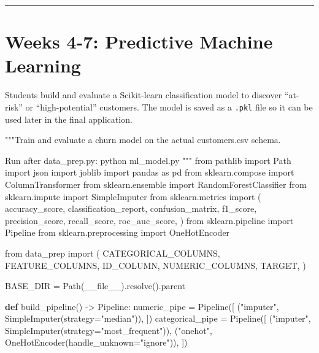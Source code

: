 \documentclass[
  indonesian,
  letterpaper,
  DIV=11,
  numbers=noendperiod]{scrreprt}
\newenvironment{Shaded}{\begin{snugshade}}{\end{snugshade}}
\newcommand{\CommentTok}[1]{\textcolor[rgb]{0.37,0.37,0.37}{#1}}
\newcommand{\ImportTok}[1]{\textcolor[rgb]{0.00,0.46,0.62}{#1}}
\newcommand{\KeywordTok}[1]{\textcolor[rgb]{0.00,0.23,0.31}{\textbf{#1}}}
\newcommand{\NormalTok}[1]{\textcolor[rgb]{0.00,0.23,0.31}{#1}}
\newcommand{\OperatorTok}[1]{\textcolor[rgb]{0.37,0.37,0.37}{#1}}
\newcommand{\StringTok}[1]{\textcolor[rgb]{0.13,0.47,0.30}{#1}}
\newcommand{\VariableTok}[1]{\textcolor[rgb]{0.07,0.07,0.07}{#1}}
\begin{document}
\begin{center}\rule{0.5\linewidth}{0.5pt}\end{center}

\section{Weeks 4-7: Predictive Machine
Learning}\label{weeks-4-7-predictive-machine-learning}

Students build and evaluate a Scikit-learn classification model to
discover ``at-risk'' or ``high-potential'' customers. The model is saved
as a \texttt{.pkl} file so it can be used later in the final
application.

\begin{Shaded}
\begin{Highlighting}[]
\CommentTok{"""Train and evaluate a churn model on the actual customers.csv schema.}

\CommentTok{Run after data\_prep.py:}
\CommentTok{    python ml\_model.py}
\CommentTok{"""}
\ImportTok{from}\NormalTok{ pathlib }\ImportTok{import}\NormalTok{ Path}
\ImportTok{import}\NormalTok{ json}
\ImportTok{import}\NormalTok{ joblib}
\ImportTok{import}\NormalTok{ pandas }\ImportTok{as}\NormalTok{ pd}
\ImportTok{from}\NormalTok{ sklearn.compose }\ImportTok{import}\NormalTok{ ColumnTransformer}
\ImportTok{from}\NormalTok{ sklearn.ensemble }\ImportTok{import}\NormalTok{ RandomForestClassifier}
\ImportTok{from}\NormalTok{ sklearn.impute }\ImportTok{import}\NormalTok{ SimpleImputer}
\ImportTok{from}\NormalTok{ sklearn.metrics }\ImportTok{import}\NormalTok{ (}
\NormalTok{    accuracy\_score,}
\NormalTok{    classification\_report,}
\NormalTok{    confusion\_matrix,}
\NormalTok{    f1\_score,}
\NormalTok{    precision\_score,}
\NormalTok{    recall\_score,}
\NormalTok{    roc\_auc\_score,}
\NormalTok{)}
\ImportTok{from}\NormalTok{ sklearn.pipeline }\ImportTok{import}\NormalTok{ Pipeline}
\ImportTok{from}\NormalTok{ sklearn.preprocessing }\ImportTok{import}\NormalTok{ OneHotEncoder}

\ImportTok{from}\NormalTok{ data\_prep }\ImportTok{import}\NormalTok{ (}
\NormalTok{    CATEGORICAL\_COLUMNS,}
\NormalTok{    FEATURE\_COLUMNS,}
\NormalTok{    ID\_COLUMN,}
\NormalTok{    NUMERIC\_COLUMNS,}
\NormalTok{    TARGET,}
\NormalTok{)}

\NormalTok{BASE\_DIR }\OperatorTok{=}\NormalTok{ Path(}\VariableTok{\_\_file\_\_}\NormalTok{).resolve().parent}


\KeywordTok{def}\NormalTok{ build\_pipeline() }\OperatorTok{{-}\textgreater{}}\NormalTok{ Pipeline:}
\NormalTok{    numeric\_pipe }\OperatorTok{=}\NormalTok{ Pipeline([}
\NormalTok{        (}\StringTok{"imputer"}\NormalTok{, SimpleImputer(strategy}\OperatorTok{=}\StringTok{"median"}\NormalTok{)),}
\NormalTok{    ])}
\NormalTok{    categorical\_pipe }\OperatorTok{=}\NormalTok{ Pipeline([}
\NormalTok{        (}\StringTok{"imputer"}\NormalTok{, SimpleImputer(strategy}\OperatorTok{=}\StringTok{"most\_frequent"}\NormalTok{)),}
\NormalTok{        (}\StringTok{"onehot"}\NormalTok{, OneHotEncoder(handle\_unknown}\OperatorTok{=}\StringTok{"ignore"}\NormalTok{)),}
\NormalTok{    ])}


\end{Highlighting}
\end{Shaded}
\end{document}
